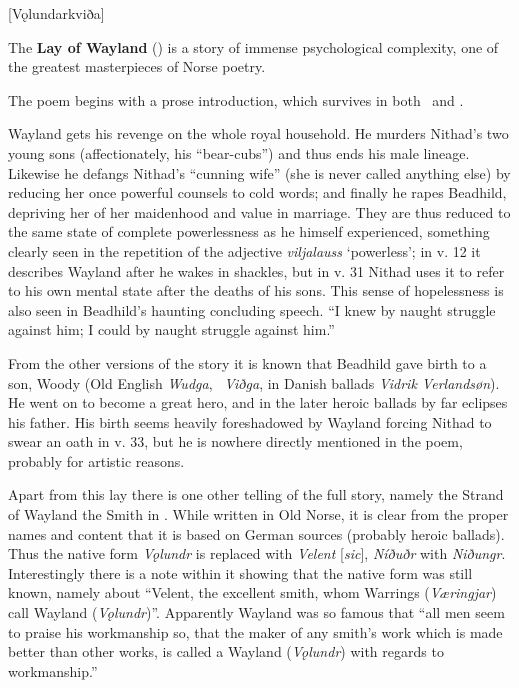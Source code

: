 [Vǫlundarkviða]



The \textbf{Lay of Wayland} (\Volundarkvida) is a story of immense psychological complexity, one of the greatest masterpieces of Norse poetry.

The poem begins with a prose introduction, which survives in both \Regius\ and \AM.



Wayland gets his revenge on the whole royal household. He murders Nithad’s two young sons (affectionately, his “bear-cubs”) and thus ends his male lineage. Likewise he defangs Nithad’s “cunning wife” (she is never called anything else) by reducing her once powerful counsels to cold words; and finally he rapes Beadhild, depriving her of her maidenhood and value in marriage. They are thus reduced to the same state of complete powerlessness as he himself experienced, something clearly seen in the repetition of the adjective \emph{viljalauss} ‘powerless’; in v. 12 it describes Wayland after he wakes in shackles, but in v. 31 Nithad uses it to refer to his own mental state after the deaths of his sons. This sense of hopelessness is also seen in Beadhild’s haunting concluding speech. “I knew by naught struggle against him; I could by naught struggle against him.”

From the other versions of the story it is known that Beadhild gave birth to a son, Woody (Old English \emph{Wudga}, \ThidreksSaga\ \emph{Viðga}, in Danish ballads \emph{Vidrik Verlandsøn}). He went on to become a great hero, and in the later heroic ballads by far eclipses his father. His birth seems heavily foreshadowed by Wayland forcing Nithad to swear an oath in v. 33, but he is nowhere directly mentioned in the poem, probably for artistic reasons.

Apart from this lay there is one other telling of the full story, namely the Strand of Wayland the Smith in \ThidreksSaga. While written in Old Norse, it is clear from the proper names and content that it is based on German sources (probably heroic ballads). Thus the native form \emph{Vǫlundr} is replaced with \emph{Velent} [\emph{sic}], \emph{Níðuðr} with \emph{Niðungr}. Interestingly there is a note within it showing that the native form was still known, namely about “Velent, the excellent smith, whom Warrings (\emph{Væringjar}) call Wayland (\emph{Vǫlundr})”. Apparently Wayland was so famous that “all men seem to praise his workmanship so, that the maker of any smith’s work which is made better than other works, is called a Wayland (\emph{Vǫlundr}) with regards to workmanship.”

